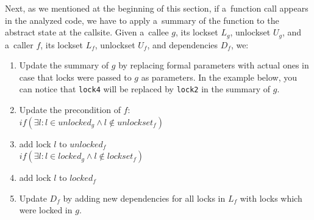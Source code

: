 \documentclass{ExcelAtFIT}
\begin{document}
Next, as we mentioned at the beginning of this section, if a~function call appears in the analyzed code, we have to apply a~summary of the function to the abstract state at the callsite. Given a~callee $g$, its lockset $L_g$, unlockset $U_g$, and a~caller $f$, its lockset $L_f$, unlockset $U_f$, and dependencies $D_f$, we:
\begin{enumerate}[label={(\arabic*)}, wide=0pt, listparindent=1.25em, parsep=0pt, topsep=0.4em]
    \item Update the summary of $g$ by replacing formal parameters with actual ones in case that locks were passed to $g$ as parameters. In the example below, you can notice that \texttt{lock4} will be replaced by \texttt{lock2} in the summary of $g$.
    \item Update the precondition of $f$:\\
$if(\exists l: l\in unlocked_{g}\wedge l\notin unlockset_{f})$
    \item[]\hspace{20pt}add lock $l$ to $unlocked_{f}$\\
$if(\exists l: l\in locked_{g}\wedge l\notin lockset_{f})$
    \item[]\hspace{20pt}add lock $l$ to $locked_{f}$
    \item Update $D_f$ by adding new dependencies for all locks in $L_f$ with locks which were locked in $g$.


\end{enumerate}
\end{document}

